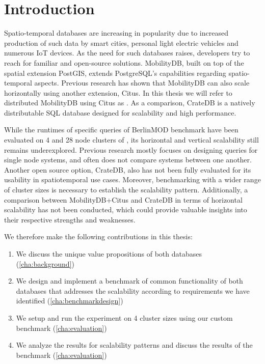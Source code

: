 \section{Introduction}
\label{cha:introduction}

Spatio-temporal databases are increasing in popularity due to increased production of such data by smart cities, personal light electric vehicles and numerous IoT devices.
As the need for such databases raises, developers try to reach for familiar and open-source solutions.
MobilityDB, built on top of the spatial extension PostGIS, extends PostgreSQL's capabilities regarding spatio-temporal aspects.
Previous research has shown that MobilityDB can also scale horizontally using another extension, Citus.
In this thesis we will refer to distributed MobilityDB using Citus as \mobilitydbc.
As a comparison, CrateDB is a natively distributable SQL database designed for scalability and high performance.

While the runtimes of specific queries of BerlinMOD benchmark have been evaluated on 4 and 28 node clusters of \mobilitydbc, its horizontal and vertical scalability still remains underexplored.
Previous research mostly focuses on designing queries for single node systems, and often does not compare systems between one another. 
Another open source option, CrateDB, also has not been fully evaluated for its usability in spatiotemporal use cases.
Moreover, benchmarking with a wider range of cluster sizes is necessary to establish the scalability pattern.
Additionally, a comparison between MobilityDB+Citus and CrateDB in terms of horizontal scalability has not been conducted, which could provide valuable insights into their respective strengths and weaknesses.

We therefore make the following contributions in this thesis:

\begin{enumerate}
    \item We discuss the unique value propositions of both databases (\cref{cha:background})
    \item We design and implement a benchmark of common functionality of both databases that addresses the scalability according to requirements we have identified (\cref{cha:benchmarkdesign})
    \item We setup and run the experiment on 4 cluster sizes using our custom benchmark (\cref{cha:evaluation})
    \item We analyze the results for scalability patterns and discuss the results of the benchmark (\cref{cha:evaluation})
\end{enumerate}
